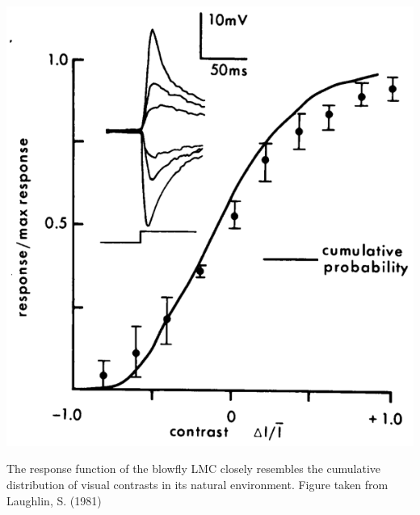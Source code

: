 \begin{marginfigure}
\includegraphics[width=\columnwidth]{figures/laughlin_81.eps}
\label{fig:laughlin}
\caption{The response function of the blowfly LMC closely resembles the cumulative distribution of visual contrasts in its natural environment. Figure taken from Laughlin, S. (1981)}
\end{marginfigure}

